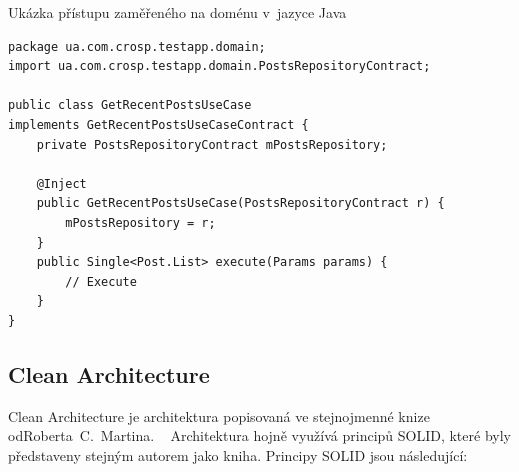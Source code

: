 \begin{listing}
    \caption{Ukázka přístupu zaměřeného na doménu v~jazyce Java~\cite{architecture}}
    \label{code:architecture-domain}
    \begin{verbatim}
package ua.com.crosp.testapp.domain;
import ua.com.crosp.testapp.domain.PostsRepositoryContract;

public class GetRecentPostsUseCase
implements GetRecentPostsUseCaseContract {
    private PostsRepositoryContract mPostsRepository;

    @Inject
    public GetRecentPostsUseCase(PostsRepositoryContract r) {
        mPostsRepository = r;
    }
    public Single<Post.List> execute(Params params) {
        // Execute
    }
}
    \end{verbatim}
\end{listing}

\subsection{Clean Architecture}

Clean Architecture je architektura popisovaná ve stejnojmenné knize
od\linebreak \mbox{Roberta~C. Martina}.
\emph{}~\cite[str.~57]{martin_clean_architecture}
Architektura hojně využívá principů SOLID,
které byly představeny stejným autorem jako kniha.
Principy SOLID jsou následující:

